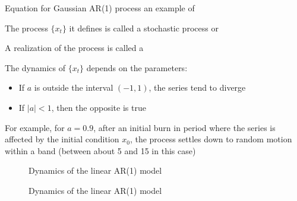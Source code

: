 \begin{frame}

    \vspace{2em}
    Equation for Gaussian AR(1) process an example of    
    
    \vspace{1em}
    The process $\{x_t\}$ it defines
    is called a stochastic process or  
    
    \vspace{2em}
    A realization of the process is called a 
    
\end{frame}

\begin{frame}
    
    \vspace{2em}
    The dynamics of $\{x_t\}$ depends on the parameters:
    \begin{itemize}
     \item If $a$ is outside the interval
    $(-1,1)$, the series tend to diverge 
    
    \item  If $|a| < 1$, then
    the opposite is true
    
    \end{itemize}
    
    \vspace{1em}
    For example, for
    $a = 0.9$, after an initial
    burn in period where the series is affected by the initial condition $x_0$,
    the process settles down to random motion within a band (between about 5 and
    15 in this case)
        
\end{frame}

\begin{frame}

    \vspace{2em}
    \begin{figure}
       \begin{center}
        \caption{Dynamics of the linear AR(1) model}
       \end{center}
    \end{figure}

\end{frame}

\begin{frame}

    \vspace{2em}
    \begin{figure}
       \begin{center}
        \caption{\label{f:ar1_dynam} Dynamics of the linear AR(1) model}
       \end{center}
    \end{figure}

\end{frame}

